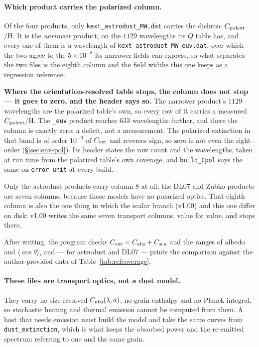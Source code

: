 \documentclass{my_memo}
\newcommand{\code}[1]{\texttt{#1}}
\begin{document}
\paragraph{Which product carries the polarized column.} Of the four products,
only \code{kext\_astrodust\_MW.dat} carries the dichroic $C_{\rm polext}$/H.
It is the \emph{narrower} product, on the $1129$ wavelengths its $Q$ table has,
and every one of them is a wavelength of
\code{kext\_astrodust\_MW\_euv.dat}, over which the two agree
to the $5\times10^{-8}$ its narrower fields can express, so what
separates the two files is the eighth column and the field widths this one
keeps as a regression reference.

\noindent \textbf{Where the orientation-resolved table stops, the column does
not stop --- it goes to zero, and the header says so.} The narrower product's
$1129$ wavelengths are the polarized table's own, so every row of it carries a
measured $C_{\rm polext}$/H. The \code{\_euv} product reaches $633$ wavelengths
further, and there the column is exactly zero: a deficit, not a measurement. The
polarized extinction in that band is of order $10^{-3}$ of $C_{\rm ext}$ and
reverses sign, so zero is not even the right order (\S\ref{sec:euv-pol}). Its
header states the row count and the wavelengths, taken at run time from the
polarized table's own coverage, and \code{build\_Cpol} says the same on
\code{error\_unit} at every build.

\noindent Only the astrodust products carry column 8 at all; the DL07 and Zubko
products are seven columns, because those models have no polarized optics. That
eighth column is also the one thing in which the scalar branch (v1.00) and this
one differ on disk: v1.00 writes the same seven transport columns, value for
value, and stops there.

After writing, the program checks $C_{\rm ext} = C_{\rm abs}+C_{\rm sca}$ and
the ranges of albedo and $\langle\cos\theta\rangle$, and --- for astrodust and
DL07 --- prints the comparison against the author-provided data of
Table~\ref{tab:refcoverage}.

\paragraph{These files are transport optics, not a dust model.} They carry no
size-resolved $C_{\rm abs}(\lambda,a)$, no grain enthalpy and no Planck
integral, so stochastic heating and thermal emission cannot be computed from
them. A host that needs emission must build the model and take the same curves
from \code{dust\_extinction}, which is what keeps the absorbed power and the
re-emitted spectrum referring to one and the same grain.
\end{document}
